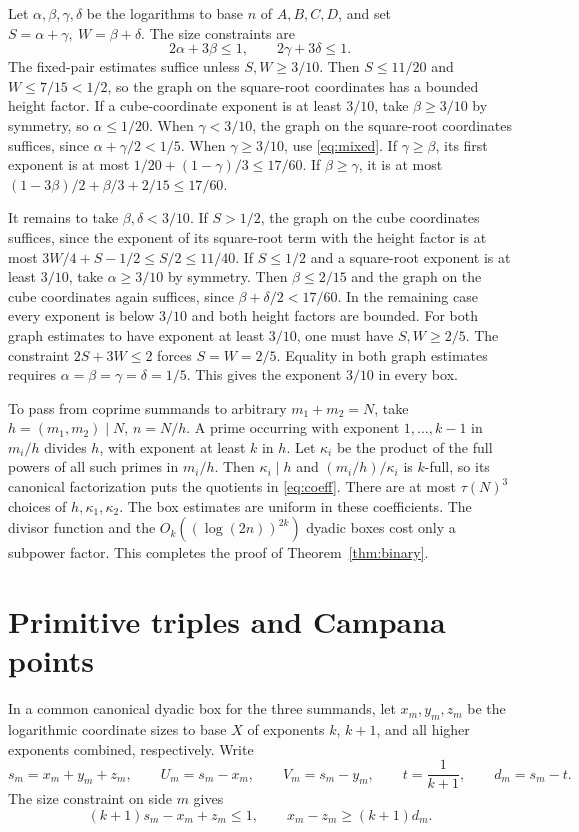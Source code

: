 \documentclass[11pt,reqno]{amsart}
\begin{document}
Let \(\alpha,\beta,\gamma,\delta\) be the logarithms to base \(n\)
of \(A,B,C,D\), and set \(S=\alpha+\gamma,\ W=\beta+\delta\).
The size constraints are
\[
 2\alpha+3\beta\le1,\qquad 2\gamma+3\delta\le1.
\]
The fixed-pair estimates suffice unless \(S,W\ge 3/10\).
Then \(S\le11/20\) and \(W\le7/15<1/2\), so the graph on the
square-root coordinates has a bounded height factor.
If a cube-coordinate exponent is at least \(3/10\), take
\(\beta\ge3/10\) by symmetry, so \(\alpha\le1/20\).
When \(\gamma<3/10\), the graph on the square-root coordinates
suffices, since \(\alpha+\gamma/2<1/5\).
When \(\gamma\ge3/10\), use \eqref{eq:mixed}.
If \(\gamma\ge\beta\), its first exponent is at most
\(1/20+(1-\gamma)/3\le17/60\). If \(\beta\ge\gamma\), it is
at most \((1-3\beta)/2+\beta/3+2/15\le17/60\).

It remains to take \(\beta,\delta<3/10\).
If \(S>1/2\), the graph on the cube coordinates suffices, since
the exponent of its square-root term with the height factor is at
most \(3W/4+S-1/2\le S/2\le11/40\).
If \(S\le1/2\) and a square-root exponent is at least \(3/10\),
take \(\alpha\ge3/10\) by symmetry. Then \(\beta\le2/15\)
and the graph on the cube coordinates again suffices, since
\(\beta+\delta/2<17/60\).
In the remaining case every exponent is below \(3/10\) and both
height factors are bounded. For both graph estimates to have
exponent at least \(3/10\), one must have \(S,W\ge2/5\).
The constraint \(2S+3W\le2\) forces \(S=W=2/5\).
Equality in both graph estimates requires
\(\alpha=\beta=\gamma=\delta=1/5\).
This gives the exponent \(3/10\) in every box.

To pass from coprime summands to arbitrary \(m_1+m_2=N\), take
\(h=(m_1,m_2)\mid N\), \(n=N/h\).
A prime occurring with exponent \(1,\ldots,k-1\) in \(m_i/h\)
divides \(h\), with exponent at least \(k\) in \(h\).
Let \(\kappa_i\) be the product of the full powers of all such
primes in \(m_i/h\). Then \(\kappa_i\mid h\) and
\((m_i/h)/\kappa_i\) is \(k\)-full, so its canonical factorization
puts the quotients in \eqref{eq:coeff}. There are at most
\(\tau(N)^3\) choices of \(h,\kappa_1,\kappa_2\).
The box estimates are uniform in these coefficients. The divisor
function and the \(O_k((\log(2n))^{2k})\) dyadic boxes cost only a
subpower factor. This completes the proof of Theorem~\ref{thm:binary}.

\section{Primitive triples and Campana points}
In a common canonical dyadic box for the three summands, let
\(x_m,y_m,z_m\) be the logarithmic coordinate sizes to base \(X\)
of exponents \(k\), \(k+1\), and all higher exponents combined,
respectively. Write
\[
 s_m=x_m+y_m+z_m,\qquad U_m=s_m-x_m,\qquad V_m=s_m-y_m,\qquad
 t=\frac1{k+1},\qquad d_m=s_m-t.
\]
The size constraint on side \(m\) gives
\begin{equation}\label{eq:triple-size}
          (k+1)s_m-x_m+z_m\le 1,
          \qquad x_m-z_m\ge(k+1)d_m .
\end{equation}
\end{document}
